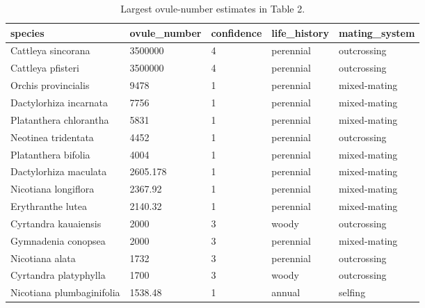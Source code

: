 \begin{table}
\caption{Largest ovule-number estimates in Table 2.}
\label{tab:largest_ovules}
\begin{adjustbox}{max width=\textwidth}
\begin{tabular}{lllll}
\toprule
species & ovule\_number & confidence & life\_history & mating\_system \\
\midrule
Cattleya sincorana & 3500000 & 4 & perennial & outcrossing \\
Cattleya pfisteri & 3500000 & 4 & perennial & outcrossing \\
Orchis provincialis & 9478 & 1 & perennial & mixed-mating \\
Dactylorhiza incarnata & 7756 & 1 & perennial & mixed-mating \\
Platanthera chlorantha & 5831 & 1 & perennial & mixed-mating \\
Neotinea tridentata & 4452 & 1 & perennial & outcrossing \\
Platanthera bifolia & 4004 & 1 & perennial & mixed-mating \\
Dactylorhiza maculata & 2605.178 & 1 & perennial & mixed-mating \\
Nicotiana longiflora & 2367.92 & 1 & perennial & mixed-mating \\
Erythranthe lutea & 2140.32 & 1 & perennial & mixed-mating \\
Cyrtandra kauaiensis & 2000 & 3 & woody & outcrossing \\
Gymnadenia conopsea & 2000 & 3 & perennial & mixed-mating \\
Nicotiana alata & 1732 & 3 & perennial & outcrossing \\
Cyrtandra platyphylla & 1700 & 3 & woody & outcrossing \\
Nicotiana plumbaginifolia & 1538.48 & 1 & annual & selfing \\
\bottomrule
\end{tabular}
\end{adjustbox}
\end{table}
